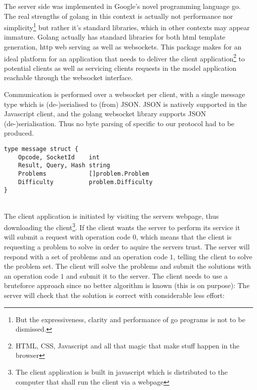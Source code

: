 The server side was implemented in Google's novel programming language go\cite{golang}. The real strengths of golang in this context is actually not performance nor simplicity\footnote{But the expressiveness, clarity and performance of go programs is not to be dismissed.} but rather it's standard libraries, which in other contexts may appear immature. Golang actually has standard libraries for both html template generation, http web serving as well as websockets. This package makes for an ideal platform for an application that needs to deliver the client application\footnote{HTML, CSS, Javascript and all that magic that make stuff happen in the browser} to potential clients as well as servicing clients requests in the model application reachable through the websocket interface. 

Communication is performed over a websocket per client, with a single message type which is (de-)serialised to (from) JSON. JSON is natively supported in the Javascript client, and the golang websocket library supports JSON (de-)serialisation. Thus no byte parsing of specific to our protocol had to be produced.
\begin{verbatim}
type message struct {
	Opcode, SocketId    int
	Result, Query, Hash string
	Problems            []problem.Problem
	Difficulty          problem.Difficulty
}
\end{verbatim}
\\
The client application is initiated by visiting the servers webpage, thus downloading the client\footnote{The client application is built in javascript which is distributed to the computer that shall run the client via a webpage}. If the client wants the server to perform its service it will submit a request with operation code $0$, which means that the client is requesting a problem to solve in order to aquire the servers trust. The server will respond with a set of problems and an operation code $1$, telling the client to solve the problem set. The client will solve the problems and submit the solutions with an operation code $1$ and submit it to the server. The client needs to use a bruteforce approach since no better algorithm is known (this is on purpose):
The server will check that the solution is correct with considerable less effort:






